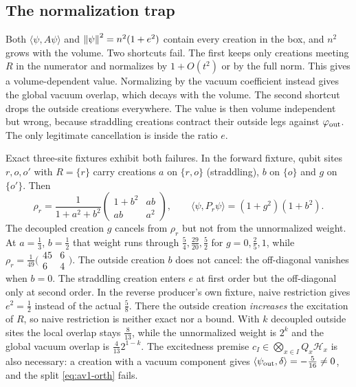 \subsection{The normalization trap}
\label{sec:av1-trap}
Both $\langle\psi,A\psi\rangle$ and $\left\lVert\psi\right\rVert^2=n^2(1+e^2)$ contain every
creation in the box, and $n^2$ grows with the volume. Two shortcuts fail. The
first keeps only creations meeting $R$ in the numerator and normalizes by
$1+O(t^2)$ or by the full norm. This gives a volume-dependent value.
Normalizing by the vacuum coefficient instead gives the global vacuum overlap,
which decays with the volume. The second shortcut drops the outside creations
everywhere. The value is then volume independent but wrong, because straddling
creations contract their outside legs against $\varphi_{\rm out}$. The only
legitimate cancellation is inside the ratio $e$.

Exact three-site fixtures exhibit both failures. In the forward fixture, qubit
sites $r,o,o'$ with $R=\{r\}$ carry creations $a$ on $\{r,o\}$ (straddling),
$b$ on $\{o\}$ and $g$ on $\{o'\}$. Then
\begin{equation}
 \rho_r=\frac{1}{1+a^2+b^2}\begin{pmatrix}1+b^2&ab\\ ab&a^2\end{pmatrix},
 \qquad
 \langle\psi,P_r\psi\rangle=(1+g^2)(1+b^2).
 \label{eq:av1-fixture}
\end{equation}
The decoupled creation $g$ cancels from $\rho_r$ but not from the unnormalized
weight. At $a=\tfrac13$, $b=\tfrac12$ that weight runs through
$\tfrac54,\tfrac{29}{20},\tfrac52$ for $g=0,\tfrac25,1$, while
$\rho_r=\tfrac1{49}\bigl(\begin{smallmatrix}45&6\\6&4\end{smallmatrix}\bigr)$.
The outside creation $b$ does not cancel: the off-diagonal vanishes when $b=0$.
The straddling creation enters $e$ at first order but the off-diagonal only at
second order. In the reverse producer's own fixture, naive restriction gives
$e^2=\tfrac12$ instead of the actual $\tfrac58$. There the outside creation
\emph{increases} the excitation of $R$, so naive restriction is neither exact
nor a bound. With $k$ decoupled outside sites the local overlap stays
$\tfrac8{13}$, while the unnormalized weight is $2^k$ and the global vacuum
overlap is $\tfrac4{13}2^{1-k}$. The excitedness premise
$c_I\in\bigotimes_{x\in I}Q_x\mathcal H_x$ is also necessary: a creation with
a vacuum component gives $\langle\psi_{\rm out},\delta\rangle=-\tfrac5{16}\ne0$,
and the split \eqref{eq:av1-orth} fails.

